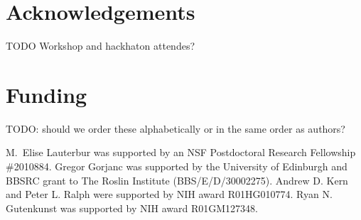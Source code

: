 \documentclass[hidelinks]{article}
\newcommand{\stdpopsim}{\texttt{stdpopsim}\xspace}
\begin{document}
%
%
%
%

\section*{Acknowledgements}\label{acknowledgements}

TODO Workshop and hackhaton attendes?

\section*{Funding}
    \label{funding}

TODO: should we order these alphabetically or in the same order as authors?

M.~Elise Lauterbur was supported by an NSF Postdoctoral Research Fellowship \#2010884.
Gregor Gorjanc was supported by the University of Edinburgh and BBSRC grant to The Roslin Institute (BBS/E/D/30002275).
Andrew D. Kern and Peter L. Ralph were supported by NIH award R01HG010774.
Ryan N. Gutenkunst was supported by NIH award R01GM127348.


\end{document}
